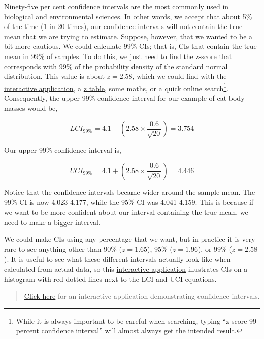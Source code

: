 \documentclass[
]{scrbook}
\begin{document}
Ninety-five per cent confidence intervals are the most commonly used in biological and environmental sciences.
In other words, we accept that about 5\% of the time (1 in 20 times), our confidence intervals will not contain the true mean that we are trying to estimate.
Suppose, however, that we wanted to be a bit more cautious.
We could calculate 99\% CIs; that is, CIs that contain the true mean in 99\% of samples.
To do this, we just need to find the z-score that corresponds with 99\% of the probability density of the standard normal distribution.
This value is about \(z = 2.58\), which we could find with the \href{https://bradduthie.shinyapps.io/zandp/}{interactive application}, a \href{https://www.z-table.com/}{z table}, some maths, or a quick online search\footnote{While it is always important to be careful when searching, typing ``z score 99 percent confidence interval'' will almost always get the intended result.}.
Consequently, the upper 99\% confidence interval for our example of cat body masses would be,

\[LCI_{99\%} = 4.1 - \left(2.58 \times \frac{0.6}{\sqrt{20}}\right) = 3.754\]

Our upper 99\% confidence interval is,

\[UCI_{99\%} = 4.1 + \left(2.58 \times \frac{0.6}{\sqrt{20}}\right) = 4.446\]

Notice that the confidence intervals became wider around the sample mean.
The 99\% CI is now 4.023-4.177, while the 95\% CI was 4.041-4.159.
This is because if we want to be more confident about our interval containing the true mean, we need to make a bigger interval.

We could make CIs using any percentage that we want, but in practice it is very rare to see anything other than 90\% (\(z = 1.65\)), 95\% (\(z = 1.96\)), or 99\% (\(z = 2.58\)).
It is useful to see what these different intervals actually look like when calculated from actual data, so this \href{https://bradduthie.shinyapps.io/CI_hist_app/}{interactive application} illustrates CIs on a histogram with red dotted lines next to the LCI and UCI equations.

\begin{quote}
\href{https://bradduthie.shinyapps.io/CI_hist_app/}{Click here} for an interactive application demonstrating confidence intervals.
\end{quote}
\end{document}
